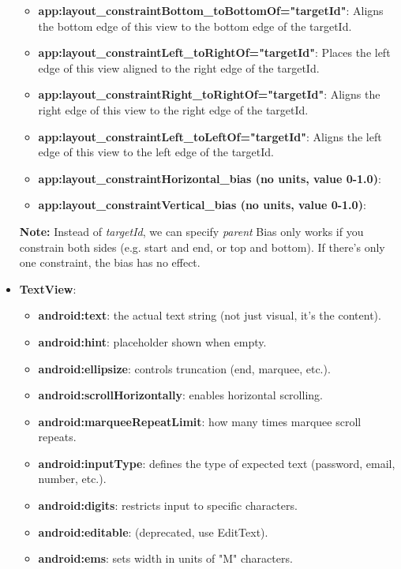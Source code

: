 \documentclass{report}
\begin{document}
\begin{itemize}
\begin{itemize}
                \item \textbf{app:layout\_constraintBottom\_toBottomOf="targetId"}: Aligns the bottom edge of this view to the bottom edge of the targetId.
                \item \textbf{app:layout\_constraintLeft\_toRightOf="targetId"}: Places the left edge of this view aligned to the right edge of the targetId.
                \item \textbf{app:layout\_constraintRight\_toRightOf="targetId"}: Aligns the right edge of this view to the right edge of the targetId.
                \item \textbf{app:layout\_constraintLeft\_toLeftOf="targetId"}: Aligns the left edge of this view to the left edge of the targetId.
                \item \textbf{app:layout\_constraintHorizontal\_bias (no units, value 0-1.0)}:
                \item \textbf{app:layout\_constraintVertical\_bias (no units, value 0-1.0)}:
            \end{itemize}
            \textbf{Note:} Instead of \textit{targetId}, we can specify \textit{parent}
            \bigbreak \noindent 
            Bias only works if you constrain both sides (e.g. start and end, or top and bottom). If there's only one constraint, the bias has no effect.
        \item \textbf{TextView}: 
            \begin{itemize}
                \item \textbf{android:text}: the actual text string (not just visual, it's the content).
                \item \textbf{android:hint}: placeholder shown when empty.
                \item \textbf{android:ellipsize}: controls truncation (end, marquee, etc.).
                \item \textbf{android:scrollHorizontally}: enables horizontal scrolling.
                \item \textbf{android:marqueeRepeatLimit}: how many times marquee scroll repeats.
                \item \textbf{android:inputType}: defines the type of expected text (password, email, number, etc.).
                \item \textbf{android:digits}: restricts input to specific characters.
                \item \textbf{android:editable}: (deprecated, use EditText).
                \item \textbf{android:ems}: sets width in units of "M" characters.

\end{itemize}
\end{itemize}
\end{document}
